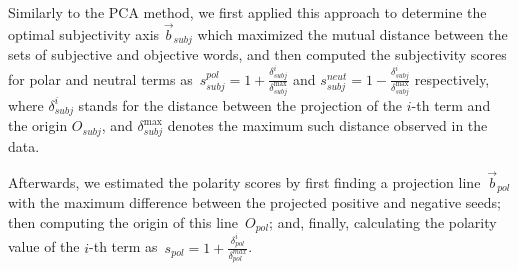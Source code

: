 Similarly to the PCA method, we first applied this approach to
determine the optimal subjectivity axis $\vec{b}_{subj}$ which
maximized the mutual distance between the sets of subjective and
objective words, and then computed the subjectivity scores for polar
and neutral terms
as~$s^{pol}_{subj} = 1 + \frac{\delta_{subj}^i}{\delta_{subj}^{\max}}$
and
$s^{neut}_{subj} = 1 - \frac{\delta_{subj}^i}{\delta_{subj}^{\max}}$
respectively, where $\delta_{subj}^i$ stands for the distance between
the projection of the $i$-th term and the origin $O_{subj}$, and
$\delta_{subj}^{\max}$ denotes the maximum such distance observed in
the data.

Afterwards, we estimated the polarity scores by first finding a
projection line~$\vec{b}_{pol}$ with the maximum difference between
the projected positive and negative seeds; then computing the origin
of this line~$O_{pol}$; and, finally, calculating the polarity value
of the $i$-th term
as~$s_{pol} = 1 + \frac{\delta^i_{pol}}{\delta^{max}_{pol}}$.

